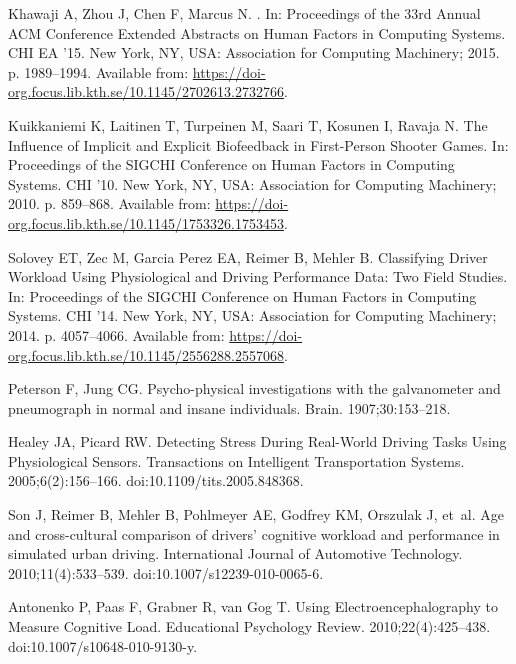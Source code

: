 \documentclass[10pt,letterpaper]{article}
\begin{document}
\begin{thebibliography}{10}
  Khawaji A, Zhou J, Chen F, Marcus N.
  .
  \newblock In: Proceedings of the 33rd Annual ACM Conference Extended Abstracts
    on Human Factors in Computing Systems. CHI EA ’15. New York, NY, USA:
    Association for Computing Machinery; 2015. p. 1989–1994.
  \newblock Available from:
    \url{https://doi-org.focus.lib.kth.se/10.1145/2702613.2732766}.
  
  Kuikkaniemi K, Laitinen T, Turpeinen M, Saari T, Kosunen I, Ravaja N.
  \newblock The Influence of Implicit and Explicit Biofeedback in First-Person
    Shooter Games.
  \newblock In: Proceedings of the SIGCHI Conference on Human Factors in
    Computing Systems. CHI ’10. New York, NY, USA: Association for Computing
    Machinery; 2010. p. 859–868.
  \newblock Available from:
    \url{https://doi-org.focus.lib.kth.se/10.1145/1753326.1753453}.
  
  Solovey ET, Zec M, {Garcia Perez} EA, Reimer B, Mehler B.
  \newblock Classifying Driver Workload Using Physiological and Driving
    Performance Data: Two Field Studies.
  \newblock In: Proceedings of the SIGCHI Conference on Human Factors in
    Computing Systems. CHI ’14. New York, NY, USA: Association for Computing
    Machinery; 2014. p. 4057–4066.
  \newblock Available from:
    \url{https://doi-org.focus.lib.kth.se/10.1145/2556288.2557068}.
  
  Peterson F, Jung CG.
  \newblock Psycho-physical investigations with the galvanometer and pneumograph
    in normal and insane individuals.
  \newblock Brain. 1907;30:153--218.
  
  Healey JA, Picard RW.
  \newblock Detecting Stress During Real-World Driving Tasks Using Physiological
    Sensors.
   Transactions on Intelligent Transportation Systems.
    2005;6(2):156--166.
  \newblock doi:{10.1109/tits.2005.848368}.
  
  Son J, Reimer B, Mehler B, Pohlmeyer AE, Godfrey KM, Orszulak J, et~al.
  \newblock Age and cross-cultural comparison of drivers' cognitive workload and
    performance in simulated urban driving.
  \newblock International Journal of Automotive Technology. 2010;11(4):533--539.
  \newblock doi:{10.1007/s12239-010-0065-6}.
  
  Antonenko P, Paas F, Grabner R, van Gog T.
  \newblock Using Electroencephalography to Measure Cognitive Load.
  \newblock Educational Psychology Review. 2010;22(4):425--438.
  \newblock doi:{10.1007/s10648-010-9130-y}.
  

\end{thebibliography}
\end{document}
